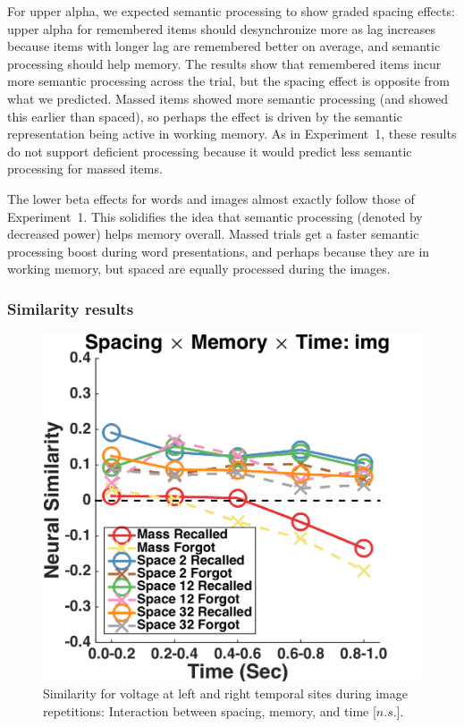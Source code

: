 For upper alpha,
we expected semantic processing to show graded spacing effects: upper alpha for remembered items should desynchronize more as lag increases because items with longer lag are remembered better on average, and semantic processing should help memory.  The results show that remembered items incur more semantic processing across the trial, but the spacing effect is opposite from what we predicted.  Massed items showed more semantic processing (and showed this earlier than spaced), so perhaps the effect is driven by the semantic representation being active in working memory.  As in Experiment~1, these results do not support deficient processing because it would predict less semantic processing for massed items.

The lower beta effects for words and images almost exactly follow those of Experiment~1.  This solidifies the idea that semantic processing (denoted by decreased power) helps memory overall.  Massed trials get a faster semantic processing boost during word presentations, and perhaps because they are in working memory, but spaced are equally processed during the images.

\subsubsection{Similarity results}

\begin{figure}[H]
  \centering
  \includegraphics[width=.40\textwidth]{./figs/exp2/similarity_spacXmemXtime_img_tla_LTRT_0to200_200to400_400to600_600to800_800to1000_kaiser_cosine}
  \caption{Similarity for voltage at left and right temporal sites during image repetitions: Interaction between spacing, memory, and time [$n.s.$].}
  \label{fig:s2_sim_tla_spacXmemXtime}
\end{figure}

